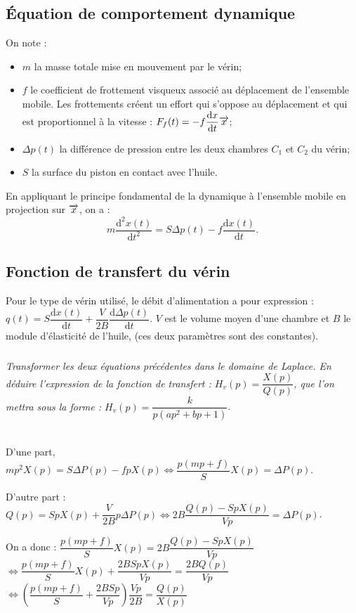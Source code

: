 \documentclass[10pt,fleqn]{article} %
\begin{document}
\begin{multicols}{2}
\subsection*{Équation de comportement dynamique}
\ifprof
\else
On note : 
\begin{itemize}
\item $m$ la masse totale mise en mouvement par le vérin;
\item $f$ le coefficient de frottement visqueux associé au déplacement de l'ensemble mobile. Les frottements créent un effort qui s'oppose au déplacement et qui est proportionnel à la vitesse : $F_f(t)=-f\dfrac{\text{d} x}{\text{d} t} \overrightarrow{x}$;
\item $\Delta p(t)$ la différence de pression entre les deux chambres $C_1$ et $C_2$ du vérin;
\item $S$ la surface du piston en contact avec l'huile.
\end{itemize}
En appliquant le principe fondamental de la dynamique à l'ensemble mobile en projection sur $\overrightarrow{x}$, on a : 
$$m\dfrac{\text{d}^2 x(t) }{\text{d}t^2}=S\Delta p(t)-f\dfrac{\text{d} x(t) }{\text{d}t}.$$
\fi


\subsection*{Fonction de transfert du vérin}
\ifprof
\else
Pour le type de vérin utilisé, le débit d'alimentation a pour expression : $q(t)=S\dfrac{\text{d}x(t)}{\text{d} t}+\dfrac{V}{2B}\dfrac{\text{d}\Delta p(t)}{\text{d}t}$. $V$ est le volume moyen d'une chambre et $B$ le module d'élasticité de l'huile, (ces deux paramètres sont des constantes).
\fi

\subparagraph{}\textit{Transformer les deux équations précédentes dans le domaine de Laplace. En déduire l'expression de la fonction de transfert : $H_v(p)=\dfrac{X(p)}{Q(p)}$, que l'on mettra sous la forme : $H_v(p)=\dfrac{k}{p\left( ap^2 + bp + 1\right)}$}.
\ifprof \begin{corrige} ~\\
D'une part, $mp^2X(p)=S\Delta P(p)-fpX(p) \Leftrightarrow \dfrac{p\left(mp+f\right)}{S}X(p)=\Delta P(p) $.

D'autre part :
$Q(p)=SpX(p)+\dfrac{V}{2B}p\Delta P(p) \Leftrightarrow 2B\dfrac{Q(p)-SpX(p)}{Vp}=\Delta P(p) $.

On a donc : 
$\dfrac{p\left(mp+f\right)}{S}X(p) =
2B\dfrac{Q(p)-SpX(p)}{Vp}$
$\Longleftrightarrow
\dfrac{p\left(mp+f\right)}{S}X(p) +\dfrac{2BSpX(p)}{Vp}=
\dfrac{2BQ(p)}{Vp}$
$\Longleftrightarrow
\left(\dfrac{p\left(mp+f\right)}{S} +\dfrac{2BSp}{Vp}\right) \dfrac{Vp}{2B}=
\dfrac{Q(p)}{ X(p)}$
\end{corrige}


\end{multicols}
\end{document}
